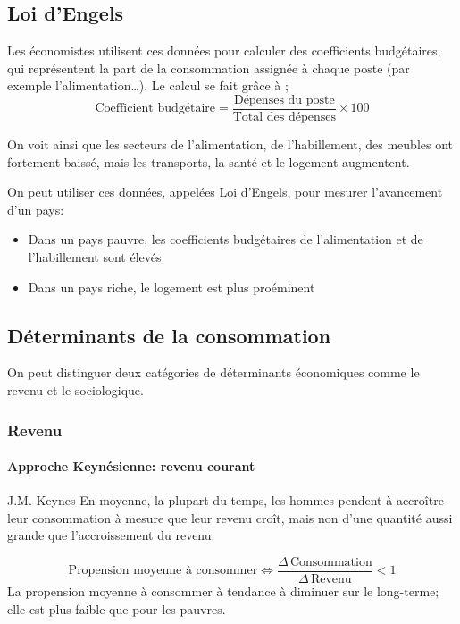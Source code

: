 \documentclass[10pt,a4paper,french]{article}
\begin{document}
\subsection{Loi d'Engels}

Les économistes utilisent ces données pour calculer des coefficients budgétaires, qui représentent la part de la consommation assignée à chaque poste (par exemple l'alimentation\ldots). Le calcul se fait grâce à ;
\[ \text{Coefficient budgétaire} = \frac{\text{Dépenses du poste}}{\text{Total des dépenses}} \times 100 \]

On voit ainsi que les secteurs de l'alimentation, de l'habillement, des meubles ont fortement baissé, mais
les transports, la santé et le logement augmentent.

On peut utiliser ces données, appelées Loi d'Engels, pour mesurer l'avancement d'un pays:
\begin{itemize}
\item Dans un pays pauvre, les coefficients budgétaires de l'alimentation et de l'habillement sont élevés
\item Dans un pays riche, le logement est plus proéminent
\end{itemize}

\subsection{Déterminants de la consommation}

On peut distinguer deux catégories de déterminants économiques comme le revenu et le sociologique.

\subsubsection{Revenu}

\paragraph{Approche Keynésienne: revenu courant}

\begin{cquote}{J.M. Keynes}
En moyenne, la plupart du temps, les hommes pendent à accroître leur consommation à mesure que leur revenu croît, mais non d'une quantité aussi grande que l'accroissement du revenu.
\end{cquote}

\[ \text{Propension moyenne à consommer} \Leftrightarrow \frac{\Delta \, \text{Consommation}}{\Delta \, \text{Revenu}} < 1 \]
La propension moyenne à consommer à tendance à diminuer sur le long-terme; elle est plus faible que pour les pauvres.
\end{document}
